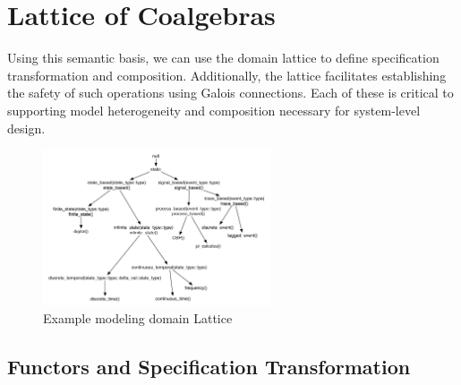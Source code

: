 \documentclass[12pt]{article}
\begin{document}
\section{Lattice of Coalgebras}

Using this semantic basis, we can use the domain lattice to define specification
transformation and composition.  Additionally, the lattice facilitates establishing the
safety of such operations using Galois connections.  Each of these is critical to
supporting model heterogeneity and composition necessary for system-level design.



\begin{figure}[hbtp]
  \centering
  \includegraphics[width=0.6\textwidth]{figures/semi-lattice-detailed.pdf}
  \caption{Example modeling domain Lattice}
  \label{fig:semi-lattice-detailed}
\end{figure}

\subsection{Functors and Specification Transformation}
\end{document}
